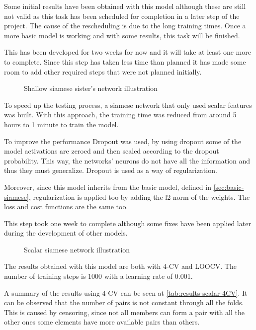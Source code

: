 Some initial results have been obtained with this model although these are still not valid as
this task has been scheduled for completion in a later step of the project. The cause of the 
rescheduling is due to the long training times. Once a more basic model is working and
with some results, this task will be finished.

This has been developed for two weeks for now and it will take at least one more to complete.
Since this step has taken less time than planned it has made some room to add other required
steps that were not planned initially.

\begin{figure}
  \centering
  
  \caption{Shallow siamese sister's network illustration \label{fig:shallow-implement}}
\end{figure}


\label{sec:scalar-only}

To speed up the testing process, a siamese network that only used scalar features 
was built. With this approach, the training time was reduced from around 5 hours 
to 1 minute to train the model. 

To improve the performance Dropout \cite{neural:dropout} was used, by using dropout some 
of the model activations are zeroed and then scaled according to the dropout probability. 
This way, the networks' neurons do not have all the information and thus they must generalize. 
Dropout is used as a way of regularization. 

Moreover, since this model inherits from the basic model, defined in \autoref{sec:basic-siamese}, 
regularization is applied too by adding the l2 norm of the weights. The loss and
cost functions are the same too.

This step took one week to complete although some fixes have been applied later during the
development of other models.

\begin{figure}
  \centering
  
  \caption{Scalar siamese network illustration \label{fig:scalar-implement}}
\end{figure}


The results obtained with this model are both with 4-CV and \gls{LOOCV}. The number of training
steps is 1000 with a learning rate of 0.001.

A summary of the results using 4-CV can be seen at \autoref{tab:results-scalar-4CV}. It can be
observed that the number of pairs is not constant through all the folds. This is caused by
censoring, since not all members can form a pair with all the other ones some elements 
have more available pairs than others. 


